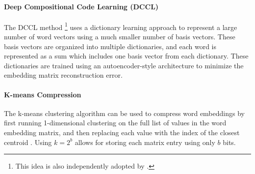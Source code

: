 \paragraph{Deep Compositional Code Learning (DCCL)} 
The DCCL method \citep{dccl17}\footnote{This idea is also independently adopted by \citet{kway18}.} uses a dictionary learning approach to represent a large number of word vectors using a much smaller number of basis vectors.
These basis vectors are organized into multiple dictionaries, and each word is represented as a sum which includes one basis vector from each dictionary.
These dictionaries are trained using an autoencoder-style architecture to minimize the embedding matrix reconstruction error.

\paragraph{K-means Compression}
The k-means clustering algorithm can be used to compress word embeddings by first running 1-dimensional clustering on the full list of values in the word embedding matrix, and then replacing each value with the index of the closest centroid \citep{andrews16}.
Using $k=2^b$ allows for storing each matrix entry using only $b$ bits.


